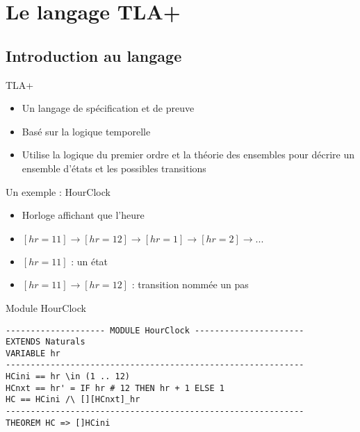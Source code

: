\documentclass{beamer}
\begin{document}
\section{Le langage TLA+}

\subsection{Introduction au langage}

\begin{frame}
	\begin{block}{TLA+}
		\begin{itemize}
			\item Un langage de spécification et de preuve
			\item Basé sur la logique temporelle
			\item Utilise la logique du premier ordre et la théorie des ensembles pour décrire un ensemble d'états et les possibles transitions
		\end{itemize}
	\end{block}
	\begin{block}{Un exemple : HourClock}
		\begin{itemize}
			\item Horloge affichant que l'heure
			\item $ [hr = 11] \rightarrow [hr = 12] \rightarrow [hr = 1] \rightarrow [hr = 2] \rightarrow ...$
			\item $[hr = 11]$ : un état
			\item $[hr = 11] \rightarrow [hr = 12]$ : transition nommée un pas
		\end{itemize}
	\end{block}
\end{frame}

\begin{frame}[containsverbatim]{Module HourClock}
\begin{lstlisting}[frame=single, basicstyle=\scriptsize]
-------------------- MODULE HourClock ----------------------
EXTENDS Naturals
VARIABLE hr
------------------------------------------------------------
HCini == hr \in (1 .. 12)
HCnxt == hr' = IF hr # 12 THEN hr + 1 ELSE 1
HC == HCini /\ [][HCnxt]_hr
------------------------------------------------------------
THEOREM HC => []HCini

\end{lstlisting}
\end{frame}
\end{document}
